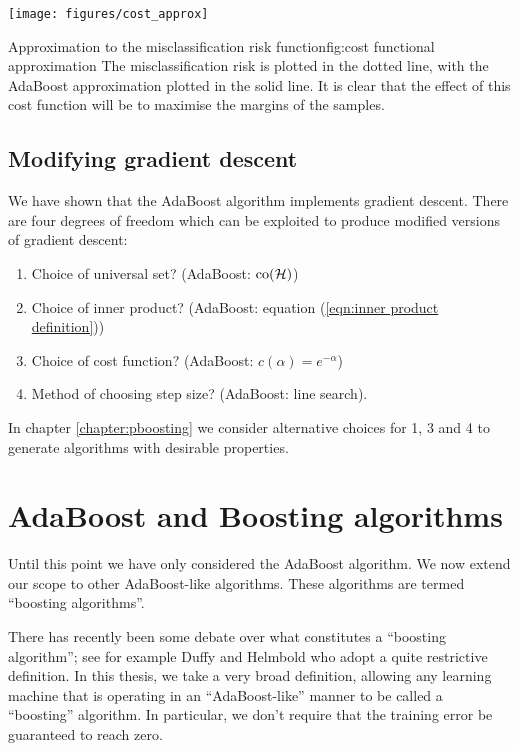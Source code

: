 \begin{linefigure}
\begin{center}
\texttt{[image: figures/cost\_approx]}
\end{center}
\begin{capt}{Approximation to the misclassification risk
function}{fig:cost functional approximation}
The misclassification risk is plotted in the dotted line, with the
AdaBoost approximation plotted in the solid line.  It is clear that
the effect of this cost function will be to maximise the margins of
the samples.
\end{capt}
\end{linefigure}

\subsection{Modifying gradient descent}

We have shown that the AdaBoost algorithm implements gradient descent.
There are four degrees of freedom which can be exploited to produce
modified versions of gradient descent:
%
\begin{enumerate}
\item	Choice of universal set? (AdaBoost: $\mathrm{co}(\mathcal{H})$)
\item	Choice of inner product? (AdaBoost: equation (\ref{eqn:inner
	product definition}))
\item	Choice of cost function? (AdaBoost: $c(\alpha) =
	e^{-\alpha}$)
\item	Method of choosing step size? (AdaBoost: line search).
\end{enumerate}
%
In chapter \ref{chapter:pboosting} we consider alternative choices for
1, 3 and 4 to generate algorithms with desirable properties.


\section{AdaBoost and Boosting algorithms}

Until this point we have only considered the AdaBoost algorithm.  We
now extend our scope to other AdaBoost-like algorithms.  These
algorithms are termed ``boosting algorithms''.

There has recently been some debate over what constitutes a ``boosting
algorithm''; see for example Duffy and Helmbold \cite{Duffy99} who
adopt a quite restrictive definition.  In this thesis, we take a very
broad definition, allowing any learning machine that is operating in
an ``AdaBoost-like'' manner to be called a ``boosting'' algorithm.  In
particular, we don't require that the training error be guaranteed to
reach zero.



